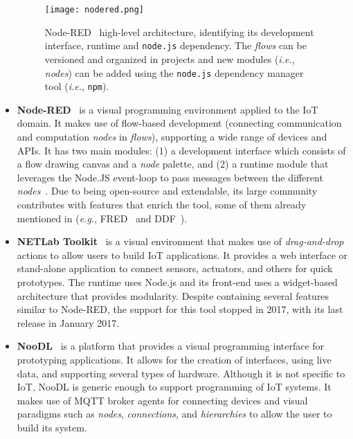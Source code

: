 \begin{itemize}

\begin{figure}[h]
\centering
\texttt{[image: nodered.png]}
\caption[Node-RED high-level architecture.]{Node-RED~\cite{node_red} high-level architecture, identifying its development interface, runtime and \texttt{node.js} dependency. The \textit{flows} can be versioned and organized in projects and new modules (\emph{i.e.}, \textit{nodes}) can be added using the \texttt{node.js} dependency manager tool (\emph{i.e.}, \texttt{npm}).}
\label{fig:nodered-seq}
\end{figure}

\item\textbf{Node-RED}~\cite{node_red} is a visual programming environment applied to the IoT domain. It makes use of flow-based development (connecting communication and computation \textit{nodes} in \textit{flows}), supporting a wide range of devices and APIs. It has two main modules: (1) a development interface which consists of a flow drawing canvas and a \textit{node} palette, and (2) a runtime module that leverages the Node.JS event-loop to pass messages between the different \textit{nodes}~. Due to being open-source and extendable, its large community contributes with features that enrich the tool, some of them already mentioned in  (\emph{e.g.}, FRED~\cite{fred} and DDF~\cite{ddf}).

\item\textbf{NETLab Toolkit}~\cite{netlabtoolkit} is a visual environment that makes use of \textit{drag-and-drop} actions to allow users to build IoT applications. It provides a web interface or stand-alone application to connect sensors, actuators, and others for quick prototypes. The runtime uses Node.js and its front-end uses a widget-based architecture that provides modularity. Despite containing several features similar to Node-RED, the support for this tool stopped in 2017, with its last release in January 2017.

\item\textbf{NooDL}~\cite{noodl} is a platform that provides a visual programming interface for prototyping applications. It allows for the creation of interfaces, using live data, and supporting several types of hardware. Although it is not specific to IoT, NooDL is generic enough to support programming of IoT systems. It makes use of MQTT broker agents for connecting devices and visual paradigms such as \textit{nodes}, \textit{connections}, and \textit{hierarchies} to allow the user to build its system.


\end{itemize}
